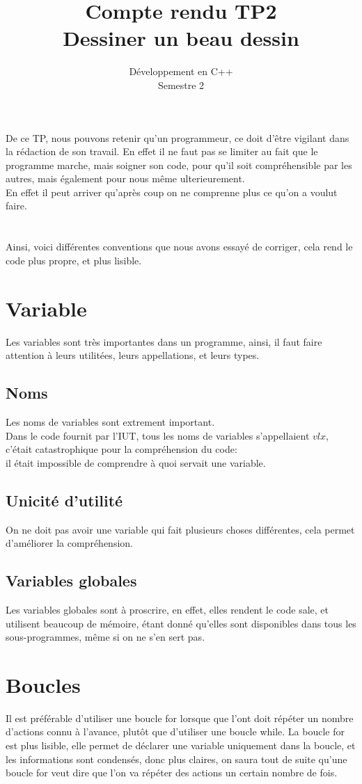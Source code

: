 \documentclass[12pt,a4paper,openany]{article}
\title{Compte rendu TP2\\ Dessiner un beau dessin}
\date{Développement en C++\\ Semestre 2\\}
\author{}
\begin{document}
	\maketitle
	De ce TP, nous pouvons retenir qu'un programmeur, ce doit d'être vigilant dans la rédaction de son
	travail. 	
	En effet il ne faut pas se limiter au fait que le programme marche, mais soigner son code, 
	pour qu'il soit compréhensible par les autres, mais également pour nous même ulterieurement.\\
	En effet il peut arriver qu'après coup on ne comprenne plus ce qu'on a voulut faire.\\ \\ \\
	
	Ainsi, voici différentes conventions que nous avons essayé de corriger, cela rend le code plus propre,
	et plus lisible.

	\section{Variable}
		Les variables sont très importantes dans un programme, ainsi, il faut faire attention à leurs
		utilitées, leurs appellations, et leurs types.
		\subsection{Noms}
			Les noms de variables sont extrement important.\\
			 Dans le code fournit par l'IUT, tous les noms 
			de variables s'appellaient $vlx$, c'était catastrophique pour la compréhension du code: \\
			il était impossible de comprendre à quoi servait une variable.
		\subsection{Unicité d'utilité}
			On ne doit pas avoir une variable qui fait plusieurs choses différentes, cela permet d'améliorer
			la compréhension.  
		\subsection{Variables globales}
			Les variables globales sont à proscrire, en effet, elles rendent le code sale, et utilisent
			beaucoup de mémoire, étant donné qu'elles sont disponibles dans tous les sous-programmes, même
			si on ne s'en sert pas.
	\section{Boucles}
		Il est préférable d'utiliser une boucle for lorsque que l'ont doit répéter un nombre d'actions
		connu à l'avance, plutôt que d'utiliser une boucle while. La boucle for est plus lisible, elle 
		permet de déclarer une variable uniquement dans la boucle, et les informations sont condensés, donc
		plus claires, on saura tout de suite qu'une boucle for veut dire que l'on va répéter des actions un
		certain nombre de fois.
\end{document}
